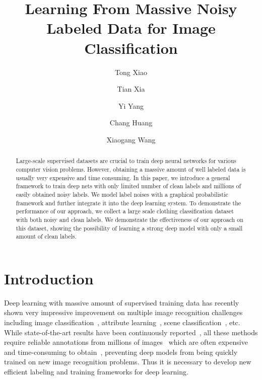 \documentclass[10pt,twocolumn,letterpaper]{article}
\begin{document}

\title{Learning From Massive Noisy Labeled Data for Image Classification}

\author[1]{Tong Xiao}
\author[2]{Tian Xia}
\author[2]{Yi Yang}
\author[2]{Chang Huang}
\author[1]{Xiaogang Wang}


\renewcommand\Authands{ and }


\maketitle

\begin{abstract}
Large-scale supervised datasets are crucial to train deep neural networks for various computer vision problems. However, obtaining a massive amount of well labeled data is usually very expensive and time consuming. In this paper, we introduce a general framework to train deep nets with only limited number of clean labels and millions of easily obtained noisy labels. We model label noises with a graphical probabilistic framework and further integrate it into the deep learning system. To demonstrate the performance of our approach, we collect a large scale clothing classification dataset with both noisy and clean labels. We demonstrate the effectiveness of our approach on this dataset, showing the possibility of learning a strong deep model with only a small amount of clean labels.
\end{abstract}

\section{Introduction} %
\label{sec:introduction}

Deep learning with massive amount of supervised training data has recently shown very impressive improvement on multiple image recognition challenges including image classification~\cite{krizhevsky2012imagenet}, attribute learning~\cite{zhang2013panda}, scene classification~\cite{farabet2013learning}, etc. While state-of-the-art results have been continuously reported~\cite{zeiler2013visualizing,simonyan2014very,szegedy2014going}, all these methods require reliable annotations from millions of images~\cite{deng2009imagenet} which are often expensive and time-consuming to obtain~\cite{deng2009imagenet}, preventing deep models from being quickly trained on new image recognition problems. Thus it is necessary to develop new efficient labeling and training frameworks for deep learning.
\end{document}
